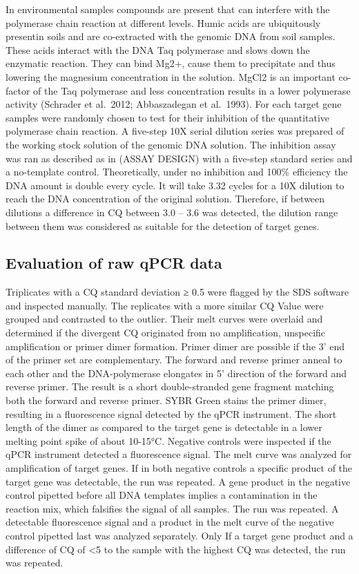 \documentclass[twoside,12pt,final]{ucthesis-CA2012}
\begin{document}
\begin{ucmainmatter}
In environmental samples compounds are present that can interfere with the polymerase chain reaction at different levels. Humic acids are ubiquitously presentin soils and are co-extracted with the genomic DNA from soil samples. These acids interact with the DNA Taq polymerase and slows down the enzymatic reaction. They can bind Mg2+, cause them to precipitate and thus lowering the magnesium concentration in the solution. MgCl2 is an important co-factor of the Taq polymerase and less concentration results in a lower polymerase activity (Schrader et al.~2012; Abbaszadegan et al.~1993).
For each target gene samples were randomly chosen to test for their inhibition of the quantitative polymerase chain reaction. A five-step 10X serial dilution series was prepared of the working stock solution of the genomic DNA solution. The inhibition assay was ran as described as in (ASSAY DESIGN) with a five-step standard series and a no-template control. Theoretically, under no inhibition and 100\% efficiency the DNA amount is double every cycle. It will take 3.32 cycles for a 10X dilution to reach the DNA concentration of the original solution. Therefore, if between dilutions a difference in CQ between 3.0 -- 3.6 was detected, the dilution range between them was considered as suitable for the detection of target genes.

\hypertarget{evaluation-of-raw-qpcr-data}{%
\subsection{Evaluation of raw qPCR data}\label{evaluation-of-raw-qpcr-data}}

Triplicates with a CQ standard deviation ≥ 0.5 were flagged by the SDS software and inspected manually. The replicates with a more similar CQ Value were grouped and contrasted to the outlier. Their melt curves were overlaid and determined if the divergent CQ originated from no amplification, unspecific amplification or primer dimer formation. Primer dimer are possible if the 3' end of the primer set are complementary. The forward and reverse primer anneal to each other and the DNA-polymerase elongates in 5' direction of the forward and reverse primer. The result is a short double-stranded gene fragment matching both the forward and reverse primer. SYBR Green stains the primer dimer, resulting in a fluorescence signal detected by the qPCR instrument. The short length of the dimer as compared to the target gene is detectable in a lower melting point spike of about 10-15°C.
Negative controls were inspected if the qPCR instrument detected a fluorescence signal. The melt curve was analyzed for amplification of target genes. If in both negative controls a specific product of the target gene was detectable, the run was repeated. A gene product in the negative control pipetted before all DNA templates implies a contamination in the reaction mix, which falsifies the signal of all samples. The run was repeated. A detectable fluorescence signal and a product in the melt curve of the negative control pipetted last was analyzed separately. Only If a target gene product and a difference of CQ of \textless5 to the sample with the highest CQ was detected, the run was repeated.


\end{ucmainmatter}
\end{document}
